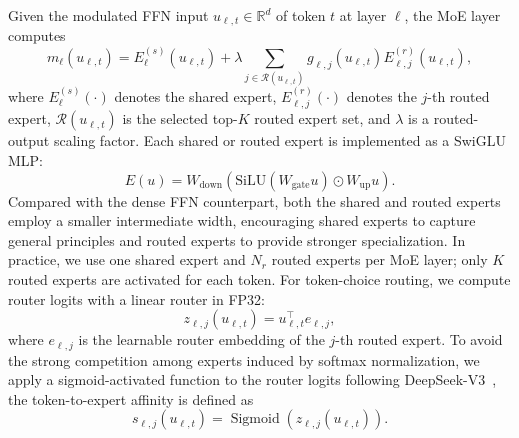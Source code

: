 Given the modulated FFN input $u_{\ell,t} \in \mathbb{R}^{d}$ of token $t$ at layer $\ell$, the MoE layer computes
\begin{equation}
m_{\ell}(u_{\ell,t}) =
E_{\ell}^{(s)}(u_{\ell,t})
+
\lambda
\sum_{j \in \mathcal{R}(u_{\ell,t})}
g_{\ell,j}(u_{\ell,t}) E_{\ell,j}^{(r)}(u_{\ell,t}),
\end{equation}
where $E_{\ell}^{(s)}(\cdot)$ denotes the shared expert, $E_{\ell,j}^{(r)}(\cdot)$ denotes the $j$-th routed expert, $\mathcal{R}(u_{\ell,t})$ is the selected top-$K$ routed expert set, and $\lambda$ is a routed-output scaling factor. Each shared or routed expert is implemented as a SwiGLU MLP:
\begin{equation}
E(u) = W_{\mathrm{down}}
\left(
\mathrm{SiLU}(W_{\mathrm{gate}}u) \odot W_{\mathrm{up}}u
\right).
\end{equation}
Compared with the dense FFN counterpart, both the shared and routed experts employ a smaller intermediate width, encouraging shared experts to capture general principles and routed experts to provide stronger specialization. In practice, we use one shared expert and $N_r$ routed experts per MoE layer; only $K$ routed experts are activated for each token.
For token-choice routing, we compute router logits with a linear router in FP32:
\begin{equation}
z_{\ell,j}(u_{\ell,t}) = u_{\ell,t}^{\top} e_{\ell,j},
\end{equation}
where $e_{\ell,j}$ is the learnable router embedding of the $j$-th routed expert. To avoid the strong competition among experts induced by softmax normalization, we apply a sigmoid-activated function to the router logits following DeepSeek-V3~\cite{liu2024deepseek}, the token-to-expert affinity is defined as
\begin{equation}
s_{\ell,j}(u_{\ell,t}) = \operatorname{Sigmoid}(z_{\ell,j}(u_{\ell,t})).
\end{equation}

